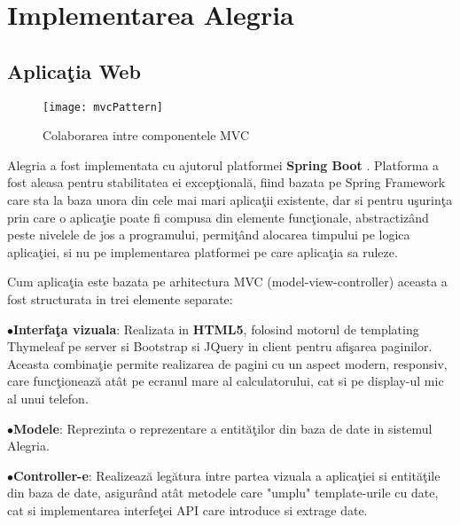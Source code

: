 \chapter{Implementarea Alegria}
\newlength{\bulletwidth}\settowidth{\bulletwidth}{$\bullet$}
\newcommand{\mitem}{\setlength{\leftskip}{\leftmargin}\hspace*{-\labelsep}\hspace*{-\bulletwidth}$\bullet$\hspace*{\labelsep}}
\newcommand{\mend}{\setlength{\leftskip}{0cm}}
\section{Aplicaţia Web}
\begin{wrapfigure}{r}{0.25\textwidth}
	\centering
	\captionsetup{justification=centering}
	\texttt{[image: mvcPattern]}
	\caption{Colaborarea intre componentele MVC}
\end{wrapfigure}
Alegria a fost implementata cu ajutorul platformei \textbf{Spring Boot} \autocite{SpringBoot}. Platforma a fost aleasa pentru stabilitatea ei excepţională, fiind bazata pe Spring Framework care sta la baza unora din cele mai mari aplicaţii existente\autocite{springUseCase}, dar si pentru uşurinţa prin care o aplicaţie poate fi compusa din elemente funcţionale, abstractizând peste nivelele de jos a programului, permiţând alocarea timpului pe logica aplicaţiei, si nu pe implementarea platformei pe care aplicaţia sa ruleze.

Cum aplicaţia este bazata pe arhitectura MVC (model-view-controller)  aceasta a fost structurata in trei elemente separate: 

\mitem  \textbf{Interfaţa vizuala}: Realizata in \textbf{HTML5}, folosind motorul de templating Thymeleaf pe server si Bootstrap si JQuery in client pentru afişarea paginilor. Aceasta combinaţie permite realizarea de pagini cu un aspect modern, responsiv, care funcţionează atât pe ecranul mare al calculatorului, cat si pe display-ul mic al unui telefon.

\mitem  \textbf{Modele}: Reprezinta o reprezentare a entităţilor din baza de date in sistemul Alegria.

\mitem  \textbf{Controller-e}: Realizează legătura intre partea vizuala a aplicaţiei si entităţile din baza de date, asigurând atât metodele care "umplu" template-urile cu date, cat si implementarea interfeţei API care introduce si extrage date.

\mend

